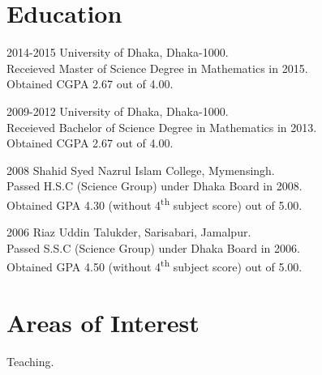 \documentclass[a4paper]{article}
\begin{document}
\section{Education}

\begin{CV}
\item[2014-2015] University of Dhaka, Dhaka-1000.\\Receieved Master of Science Degree in Mathematics in 2015.\\Obtained CGPA 2.67 out of 4.00.
\item[2009-2012] University of Dhaka, Dhaka-1000.\\Receieved Bachelor of Science Degree in Mathematics in 2013.\\Obtained CGPA 2.67 out of 4.00.
\item[2008] Shahid Syed Nazrul Islam College, Mymensingh.\\Passed H.S.C (Science Group) under Dhaka Board in 2008.\\Obtained GPA 4.30 (without 4\textsuperscript{th} subject score) out of 5.00.
\item[2006] Riaz Uddin Talukder, Sarisabari, Jamalpur.\\Passed S.S.C (Science Group) under Dhaka Board in 2006.\\Obtained GPA 4.50 (without 4\textsuperscript{th} subject score) out of 5.00.
\end{CV}




\section{Areas of Interest}
\begin{CV}
\item Teaching.
\end{CV}
\end{document}
